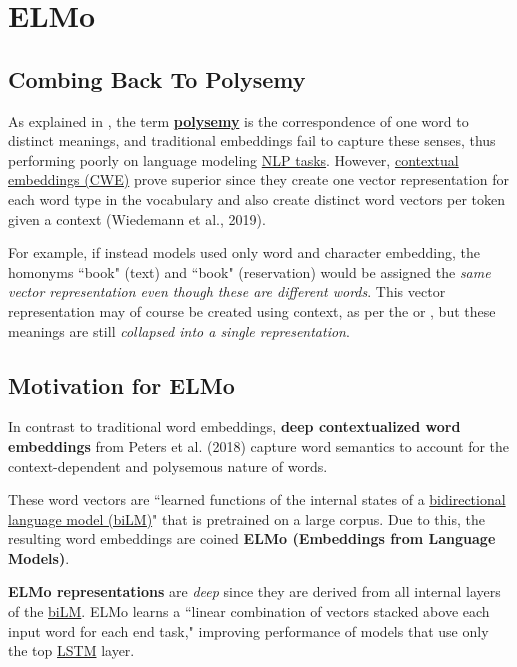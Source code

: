 \section{ELMo} \label{sec:ELMo}


\subsection{Combing Back To Polysemy} \label{sec:PolysemyAgainInElmo} 

As explained in , the term \textbf{\hyperref[sec:Polysemy]{polysemy}} is the correspondence of one word to distinct meanings, and traditional embeddings fail to capture these senses, thus performing poorly on language modeling \hyperref[app:Appendix_NLPTasks]{NLP tasks}. However, \hyperref[sec:SolutionWithContextEmbs]{contextual embeddings (CWE)} prove superior since they create one vector representation for each word type in the vocabulary and also create distinct word vectors per token given a context (Wiedemann et al., 2019).   

For example, if instead models used only word and character embedding, the homonyms ``book" (text) and ``book" (reservation) would be assigned the \emph{same vector representation even though these are different words}. This vector representation may of course be created using context, as per the  or , but these meanings are still \emph{collapsed into a single representation}.


\subsection{Motivation for ELMo} 


In contrast to traditional word embeddings, \textbf{deep contextualized word embeddings} from Peters et al. (2018) capture word semantics to account for the context-dependent and polysemous nature of words.  

These word vectors are ``learned functions of the internal states of a \hyperref[sec:BidirectionalLM]{bidirectional language model (biLM)}" that is pretrained on a large corpus. Due to this, the resulting word embeddings are coined \textbf{ELMo (Embeddings from Language Models)}.  

\textbf{ELMo representations} are \emph{deep} since they are derived from all internal layers of the \hyperref[sec:BidirectionalLM]{biLM}. ELMo learns a ``linear combination of vectors stacked above each input word for each end task," improving performance of models that use only the top \hyperref[sec:LSTM]{LSTM} layer.  

